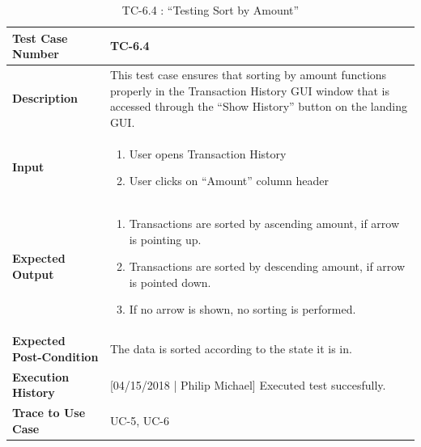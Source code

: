 \documentclass[12pt]{article}
\begin{document}
\begin{table}[H]
\caption{TC-6.4 : “Testing Sort by Amount”}
\begin{center}
\begin{tabular}{|p{5.5	cm}|p{11cm}|}
  \hline
  \bf Test Case Number & TC-6.4\\\hline
  \bf Description & This test case ensures that sorting by amount functions properly in the Transaction History GUI window that is accessed through the ``Show History'' button on the landing GUI.\\\hline
  \bf Input &
  \begin{enumerate}
  \item User opens Transaction History
  \item User clicks on ``Amount'' column header
  \end{enumerate}
  \\\hline
  \bf Expected Output &
  \begin{enumerate}
  \item Transactions are sorted by ascending amount, if arrow is pointing up.
  \item Transactions are sorted by descending amount, if arrow is pointed down.
  \item If no arrow is shown, no sorting is performed.
  \end{enumerate}
  \\\hline
  \bf Expected Post-Condition & The data is sorted according to the state it is in.\\\hline
  \bf Execution History & [04/15/2018 | Philip Michael] Executed test succesfully.\\\hline
  \bf Trace to Use Case & UC-5, UC-6\\

  \hline
\end{tabular}
\end{center}
\end{table}
\end{document}
